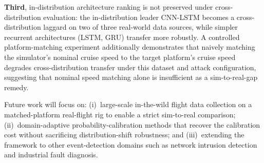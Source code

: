 \documentclass{ieeeaccess}
\begin{document}
\textbf{Third}, in-distribution architecture ranking is not preserved
under cross-distribution evaluation: the in-distribution leader CNN-LSTM
becomes a cross-distribution laggard on two of three real-world data
sources, while simpler recurrent architectures (LSTM, GRU) transfer more
robustly. A controlled platform-matching experiment additionally
demonstrates that naively matching the simulator's nominal cruise speed
to the target platform's cruise speed degrades cross-distribution
transfer under this dataset and attack configuration, suggesting that
nominal speed matching alone is insufficient as a sim-to-real-gap
remedy.

Future work will focus on:
(i)~large-scale in-the-wild flight data collection on a matched-platform
real-flight rig to enable a strict sim-to-real comparison;
(ii)~domain-adaptive probability-calibration methods that recover the
calibration cost without sacrificing distribution-shift robustness; and
(iii)~extending the framework to other event-detection domains such as
network intrusion detection and industrial fault diagnosis.
\end{document}
